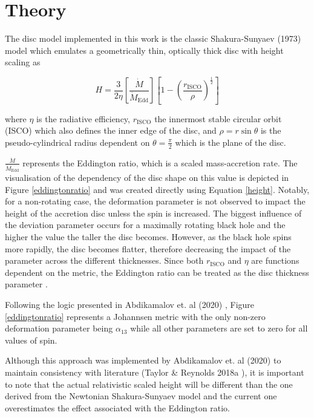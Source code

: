 \documentclass[fleqn,usenatbib,useAMS]{mnras}
\begin{document}
\section{Theory}
The disc model implemented in this work is the classic Shakura-Sunyaev (1973) model \cite{shakura1973black} which emulates a geometrically thin, optically thick disc with height scaling as

\begin{equation}
    H=\frac{3}{2\eta} \left[\frac{\dot{M}}{\dot{M}_\text{Edd}}\right]\left [1-\left(\frac{r_\text{ISCO}}{\rho}\right)^\frac{1}{2}\right]
    \label{height}
\end{equation}


where $\eta$ is the radiative efficiency, $r_\text{ISCO}$ the innermost stable circular orbit (ISCO) which also defines the inner edge of the disc, and $\rho = r \sin\theta$ is the pseudo-cylindrical radius dependent on $\theta = \frac{\pi}{2}$ which is the plane of the disc. 

$\frac{\dot{M}}{\dot{M}_\text{Edd}}$ represents the Eddington ratio, which is a scaled mass-accretion rate. The visualisation of the dependency of the disc shape on this value is depicted in Figure \ref{eddingtonratio} and was created directly using Equation \ref{height}. 
Notably, for a non-rotating case, the deformation parameter is not observed to impact the height of the accretion disc unless the spin is increased. The biggest influence of the deviation parameter occurs for a maximally rotating black hole and the higher the value the taller the disc becomes. However, as the black hole spins more rapidly, the disc becomes flatter, therefore decreasing the impact of the parameter across the different thicknesses.
Since both $r_{\text{ISCO}}$ and $\eta$ are functions dependent on the metric, the Eddington ratio can be treated as the disc thickness parameter \cite{abdikamalov2020testing}. 

Following the logic presented in Abdikamalov et. al (2020) \cite{abdikamalov2020testing}, Figure \ref{eddingtonratio} represents a Johannsen metric with the only non-zero deformation parameter being $\alpha_{13}$ while all other parameters are set to zero for all values of spin.

Although this approach was implemented by Abdikamalov et. al (2020) \cite{abdikamalov2020testing} to maintain consistency with literature (Taylor \& Reynolds 2018a \cite{taylor2018exploring}), it is important to note that the actual relativistic scaled height will be different than the one derived from the Newtonian Shakura-Sunyaev model and the current one overestimates the effect associated with the Eddington ratio. 
\end{document}
